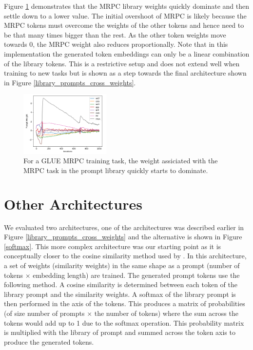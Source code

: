 \documentclass[final,6p,times,twocolumn,authoryear]{elsarticle}
\begin{document}
Figure \ref{prompt_weight_vs_iterations} demonstrates that the MRPC library weights quickly dominate and then settle down to a lower value. The initial overshoot of MRPC is likely because the MRPC tokens must overcome the weights of the other tokens and hence need to be that many times bigger than the rest. As the other token weights move towards 0, the MRPC weight also reduces proportionally. Note that in this implementation the generated token embeddings can only be a linear combination of the library tokens. This is a restrictive setup and does not extend well when training to new tasks but is shown as a step towards the final architecture shown in Figure \ref{library_prompts_cross_weights}.

\begin{figure}
\centering
\includegraphics[width=0.4\textwidth]{prompt_weight_vs_iterations.png}
\caption{For a GLUE MRPC training task, the weight assiciated with the MRPC task in the prompt library quickly starts to dominate.}
\label{prompt_weight_vs_iterations}
\end{figure}

\section{Other Architectures}
We evaluated two architectures, one of the architectures was described earlier in Figure \ref{library_prompts_cross_weights} and the alternative is shown in Figure \ref{softmax}. This more complex architecture was our starting point as it is conceptually closer to the cosine similarity method used by \cite{vu_2022}. In this architecture, a set of weights (similarity weights) in the same shape as a prompt (number of tokens $\times$ embedding length) are trained. The generated prompt tokens use the following method. A cosine similarity is determined between each token of the library prompt and the similarity weights. A softmax of the library prompt is then performed in the axis of the tokens. This produces a matrix of probabilities (of size number of prompts $\times$ the number of tokens) where the sum across the tokens would add up to 1 due to the softmax operation. This probability matrix is multiplied with the library of prompt and summed across the token axis to produce the generated tokens.
\end{document}
